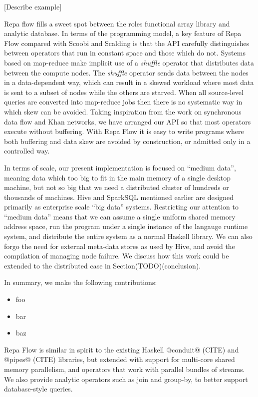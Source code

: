 [Describe example]

Repa flow fills a sweet spot between the roles functional array library and analytic database. In terms of the programming model, a key feature of Repa Flow compared with Scoobi and Scalding is that the API carefully distinguishes between operators that run in constant space and those which do not. Systems based on map-reduce make implicit use of a \emph{shuffle} operator that distributes data between the compute nodes. The \emph{shuffle} operator sends data between the nodes in a data-dependent way, which can result in a skewed workload where most data is sent to a subset of nodes while the others are starved. When all source-level queries are converted into map-reduce jobs then there is no systematic way in which skew can be avoided. Taking inspiration from the work on synchronous data flow and Khan networks, we have arranged our API so that most operators execute without buffering. With Repa Flow it is easy to write programs where both buffering and data skew are avoided by construction, or admitted only in a controlled way.

In terms of scale, our present implementation is focused on ``medium data'', meaning data which too big to fit in the main memory of a single desktop machine, but not so big that we need a distributed cluster of hundreds or thousands of machines. Hive and SparkSQL mentioned earlier are designed primarily as enterprise scale ``big data'' systems. Restricting our attention to ``medium data'' means that we can assume a single uniform shared memory address space, run the program under a single instance of the langauge runtime system, and distribute the entire system as a normal Haskell library. We can also forgo the need for external meta-data stores as used by Hive, and avoid the compilation of managing node failure. We discuss how this work could be extended to the distributed case in Section(TODO)(conclusion).


In summary, we make the following contributions:
\begin{itemize}
\item foo
\item bar
\item baz
\end{itemize}

Repa Flow is similar in spirit to the existing Haskell @conduit@ (CITE) and @pipes@ (CITE) libraries, but extended with support for multi-core shared memory parallelism, and operators that work with parallel bundles of streams. We also provide analytic operators such as join and group-by, to better support database-style queries.


